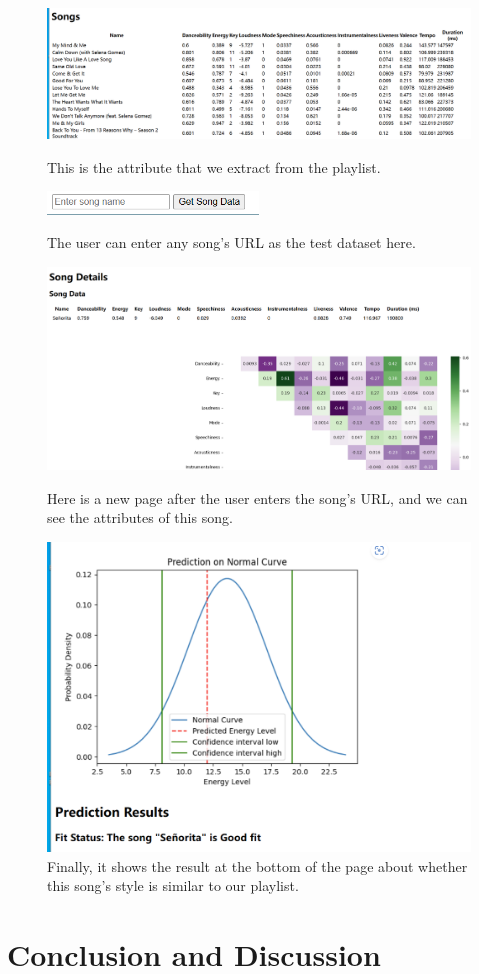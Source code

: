 \documentclass{article}
\begin{document}
\begin{figure}[h]
\centering
\includegraphics[width=1\textwidth]{2.png}
\caption{This is the attribute that we extract from the playlist.}
\includegraphics[width=0.5\textwidth]{3.png}
\caption{The user can enter any song's URL as the test dataset here.}
\includegraphics[width=1\textwidth]{4.png}
\caption{Here is a new page after the user enters the song's URL, and we can see the attributes of this song.}
\includegraphics[width=1\textwidth]{5.png}
\caption{Finally, it shows the result at the bottom of the page about whether this song's style is similar to our playlist.}
\label{fig:enter-label}
\end{figure}
\clearpage
\section{Conclusion and Discussion}
\end{document}
